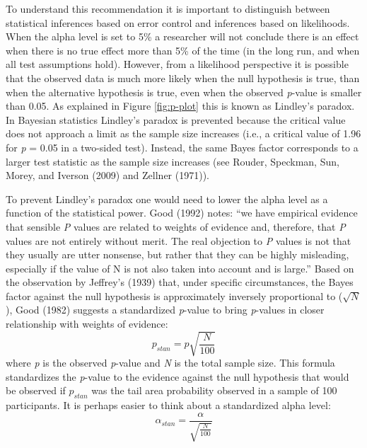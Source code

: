 \documentclass[,jou,floatsintext]{apa6}
\begin{document}
To understand this recommendation it is important to distinguish between statistical inferences based on error control and inferences based on likelihoods. When the alpha level is set to 5\% a researcher will not conclude there is an effect when there is no true effect more than 5\% of the time (in the long run, and when all test assumptions hold). However, from a likelihood perspective it is possible that the observed data is much more likely when the null hypothesis is true, than when the alternative hypothesis is true, even when the observed \emph{p}-value is smaller than 0.05. As explained in Figure \ref{fig:p-plot} this is known as Lindley's paradox. In Bayesian statistics Lindley's paradox is prevented because the critical value does not approach a limit as the sample size increases (i.e., a critical value of 1.96 for \emph{p} = 0.05 in a two-sided test). Instead, the same Bayes factor corresponds to a larger test statistic as the sample size increases (see Rouder, Speckman, Sun, Morey, and Iverson (2009) and Zellner (1971)).

To prevent Lindley's paradox one would need to lower the alpha level as a function of the statistical power. Good (1992) notes: \enquote{we have empirical evidence that sensible \emph{P} values are related to weights of evidence and, therefore, that \emph{P} values are not entirely without merit. The real objection to \emph{P} values is not that they usually are utter nonsense, but rather that they can be highly misleading, especially if the value of N is not also taken into account and is large.} Based on the observation by Jeffrey's (1939) that, under specific circumstances, the Bayes factor against the null hypothesis is approximately inversely proportional to (\(\sqrt{N}\)), Good (1982) suggests a standardized \emph{p}-value to bring \emph{p}-values in closer relationship with weights of evidence:
\begin{equation}
p_{stan} = p\sqrt{\frac{N}{100}} 
\label{eq:pstan}
\end{equation}
where \emph{p} is the observed \emph{p}-value and \emph{N} is the total sample size. This formula standardizes the \emph{p}-value to the evidence against the null hypothesis that would be observed if \(p_{stan}\) was the tail area probability observed in a sample of 100 participants. It is perhaps easier to think about a standardized alpha level:
\begin{equation}
\alpha_{stan} = \frac{\alpha}{\sqrt{\frac{N}{100}}} \label{eq:astan}
\end{equation}
\end{document}
